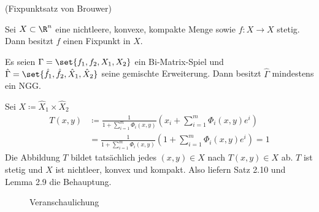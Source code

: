 \begin{satz}(Fixpunktsatz von Brouwer)

Sei $X \subset \R^{n}$ eine nichtleere, konvexe, kompakte Menge sowie $f: X \to X$ stetig. Dann besitzt $f$ einen Fixpunkt in $X$.
\end{satz}
\begin{korollar}
  Es seien $\Gamma = \set{f_{1}, f_{2}, X_{1}, X_{2}}$ ein Bi-Matrix-Spiel und $\hat\Gamma = \set{\hat f_{1},\hat f_{2},\hat X_{1},\hat X_{2}}$ seine gemischte Erweiterung. Dann besitzt $\hat\Gamma$ mindestens ein NGG.
\end{korollar}
\begin{beweis}
  Sei $X \coloneqq \hat X_{1} \times \hat X_{2}$
  \begin{align*}
T(x, y) &\coloneqq  \frac 1 {1 + \sum_{i = 1}^{m}\Phi_{i}(x, y)}\left(x_{i} + \sum_{i = 1}^{m}\Phi_{i}(x, y)e^{i}\right)\\
&= \frac 1 {1 + \sum_{i = 1}^{m}\Phi_{i}(x, y)}\left(1 + \sum_{i = 1}^{m}\Phi_{i}(x, y)e^{i}\right) = 1
  \end{align*}
Die Abbildung $T$ bildet tatsächlich jedes $(x, y) \in X$ nach $T(x, y) \in X$ ab. $T$ ist stetig und $X$ ist nichtleer, konvex und kompakt. Also liefern Satz 2.10 und Lemma 2.9 die Behauptung.
\begin{figure}[h!]
  \centering
  
  \caption{Veranschaulichung}
  \label{fig:pic}
\end{figure}
\end{beweis}

